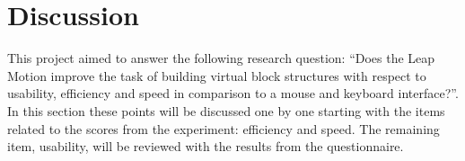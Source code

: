 \section{Discussion}

This project aimed to answer the following research question: “Does the Leap Motion improve the task of building virtual block structures with respect to usability, efficiency and 
speed in comparison to a mouse and keyboard interface?”. 
In this section these points will be discussed one by one starting with the items related to the scores from the experiment: 
efficiency and speed. The remaining item, usability, will be reviewed with the results from the questionnaire.



